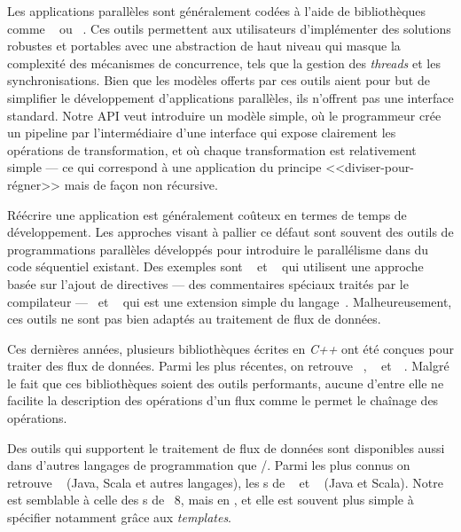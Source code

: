 \begin{introduction}
Les applications parall\`eles sont g\'en\'eralement cod\'ees \`a l'aide de biblioth\`eques comme ~\citep{AldinucciEtAl14} ou ~\citep{Reinders07}. Ces outils permettent aux utilisateurs d'implémenter des solutions robustes et portables avec une abstraction de haut niveau qui masque la complexit\'e des m\'ecanismes de concurrence, tels que la gestion des \emph{threads} et les synchronisations. Bien que les mod\`eles offerts par ces outils aient pour but de simplifier le d\'eveloppement d'applications parall\`eles, ils n'offrent pas une interface standard. Notre API veut introduire un mod\`ele simple, o\`u le programmeur cr\'ee un pipeline par l'interm\'ediaire d'une interface qui expose clairement les op\'erations de transformation, et o\`u chaque transformation est relativement simple --- ce qui correspond \`a une application du
principe <<diviser-pour-r\'egner>> mais de fa\c{c}on non r\'ecursive.

R\'e\'ecrire une application est g\'en\'eralement co\^uteux en termes de temps de d\'eveloppement. Les approches visant \`a pallier ce d\'efaut sont souvent des outils de programmations parall\`eles d\'evelopp\'es pour introduire le parall\'elisme dans du code s\'equentiel existant. Des exemples sont ~\citep{ChandraEtAl01} et ~\citep{farber2016parallel} qui utilisent une approche bas\'ee sur l'ajout de directives --- des commentaires sp\'eciaux trait\'es par le compilateur ---~ et ~\citep{leiserson1998programming} qui est une extension simple du langage~. Malheureusement, ces outils ne sont pas bien adapt\'es au traitement de flux de donn\'ees.

Ces derni\`eres ann\'ees, plusieurs biblioth\`eques \'ecrites en \emph{C++} ont \'et\'e con\c{c}ues pour traiter des flux de donn\'ees. Parmi les plus r\'ecentes, on retrouve ~\citep{beard2017raftlib}, ~\citep{starPuReferenceEnLigne} et~~\citep{skePuReferenceEnLigne}. Malgr\'e le fait que ces bibliothèques soient des outils performants, aucune d'entre elle ne facilite la description des op\'erations d'un flux comme le permet le cha\^inage des op\'erations.


Des outils qui supportent le traitement de flux de donn\'ees sont disponibles aussi dans d'autres langages de programmation que /. Parmi les plus connus on retrouve ~\citep{frampton2015mastering} (Java, Scala et autres langages), les s de ~\citep{warburton2014java} et ~\citep{flinkReferenceEnLigne} (Java et Scala). Notre  est semblable \`a celle des s de ~8, mais en , et elle est souvent plus simple \`a sp\'ecifier notamment gr\^ace aux \emph{templates}.




\end{introduction}
